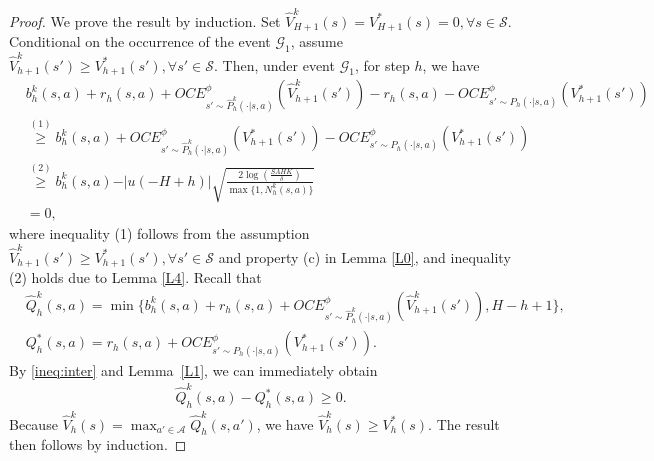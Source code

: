 \documentclass[11pt]{article}
\newcommand{\1}{\mathbbm{1}}
\begin{document}
\begin{proof}
We prove the result by induction. 
Set $\hat{V}^k_{H+1}(s)=V^*_{H+1}(s)=0,\forall s\in \mathcal{S}$. Conditional on the occurrence of the event $\mathcal{G}_1$, assume $\hat{V}^{k}_{h+1}(s')\geq V^*_{h+1}(s'),\forall s'\in\mathcal{S}$. Then, under event $\mathcal{G}_1$, for step $h$, we have
\begin{align}
&b_h^k(s,a)+r_h(s,a)+OCE^{\phi}_{s'\sim \hat{P}^k_h(\cdot\vert s,a)}(\hat{V}^k_{h+1}(s'))-r_h(s,a)-OCE^{\phi}_{s'\sim P_h(\cdot\vert s,a)}(V^*_{h+1}(s')) \nonumber \\
& \overset{(1)}{\geq} b_h^k(s,a)+OCE^{\phi}_{s'\sim \hat{P}^k_h(\cdot\vert s,a)}(V^*_{h+1}(s'))-OCE^{\phi}_{s'\sim P_h(\cdot\vert s,a)}(V^*_{h+1}(s')) \nonumber \\
& \overset{(2)}{\geq} b_h^k(s,a)-\vert u(-H+h)\vert\sqrt{\frac{2\log\left (\frac{SAHK}{\delta}\right )}{\max\{1,N^k_h(s,a)\}}} \nonumber\\
& =0, \label{ineq:inter}
\end{align}
where inequality (1) follows from the assumption $\hat{V}^{k}_{h+1}(s')\geq V^*_{h+1}(s'),\forall s'\in\mathcal{S}$ and property (c) in Lemma \ref{L0}, and inequality (2) holds due to Lemma \ref{L4}. 
Recall that
\begin{align*}
&\hat{Q}_h^k(s,a)=\min\{b_h^k(s,a)+r_h(s,a)+OCE^{\phi}_{s'\sim \hat{P}^k_h(\cdot\vert s,a)}(\hat{V}^k_{h+1}(s')),H-h+1\},\\
&Q_h^*(s,a)=r_h(s,a)+OCE^{\phi}_{s'\sim P_h(\cdot\vert s,a)}(V^*_{h+1}(s')). 
\end{align*}
By \eqref{ineq:inter} and Lemma~\ref{L1}, we can immediately obtain 
\begin{align*}
\hat{Q}_h^k(s,a)-Q^*_h(s,a)\geq 0.
\end{align*}
Because $\hat{V}_h^k(s)=\max_{a'\in\mathcal{A}}\hat{Q}^k_h(s,a')$, we have $\hat{V}_h^k(s)\geq V_h^*(s)$. The result then follows by induction. 
\end{proof}
\end{document}
